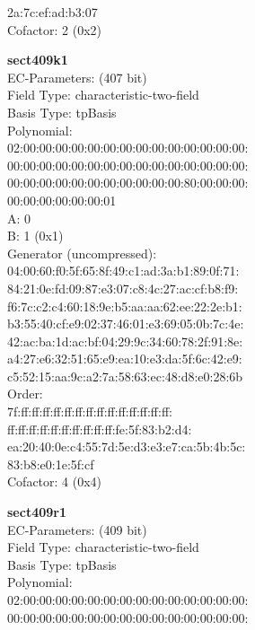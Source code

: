     2a:7c:ef:ad:b3:07\\
Cofactor:  2 (0x2)\\
\item \textbf{ sect409k1 }\\
EC-Parameters: (407 bit)\\
Field Type: characteristic-two-field\\
Basis Type: tpBasis\\
Polynomial:\\
    02:00:00:00:00:00:00:00:00:00:00:00:00:00:00:\\
    00:00:00:00:00:00:00:00:00:00:00:00:00:00:00:\\
    00:00:00:00:00:00:00:00:00:00:00:80:00:00:00:\\
    00:00:00:00:00:00:01\\
A:    0\\
B:    1 (0x1)\\
Generator (uncompressed):\\
    04:00:60:f0:5f:65:8f:49:c1:ad:3a:b1:89:0f:71:\\
    84:21:0e:fd:09:87:e3:07:c8:4c:27:ac:cf:b8:f9:\\
    f6:7c:c2:c4:60:18:9e:b5:aa:aa:62:ee:22:2e:b1:\\
    b3:55:40:cf:e9:02:37:46:01:e3:69:05:0b:7c:4e:\\
    42:ac:ba:1d:ac:bf:04:29:9c:34:60:78:2f:91:8e:\\
    a4:27:e6:32:51:65:e9:ea:10:e3:da:5f:6c:42:e9:\\
    c5:52:15:aa:9c:a2:7a:58:63:ec:48:d8:e0:28:6b\\
Order: \\
    7f:ff:ff:ff:ff:ff:ff:ff:ff:ff:ff:ff:ff:ff:ff:\\
    ff:ff:ff:ff:ff:ff:ff:ff:ff:ff:fe:5f:83:b2:d4:\\
    ea:20:40:0e:c4:55:7d:5e:d3:e3:e7:ca:5b:4b:5c:\\
    83:b8:e0:1e:5f:cf\\
Cofactor:  4 (0x4)\\
\item \textbf{ sect409r1 }\\
EC-Parameters: (409 bit)\\
Field Type: characteristic-two-field\\
Basis Type: tpBasis\\
Polynomial:\\
    02:00:00:00:00:00:00:00:00:00:00:00:00:00:00:\\
    00:00:00:00:00:00:00:00:00:00:00:00:00:00:00:\\
